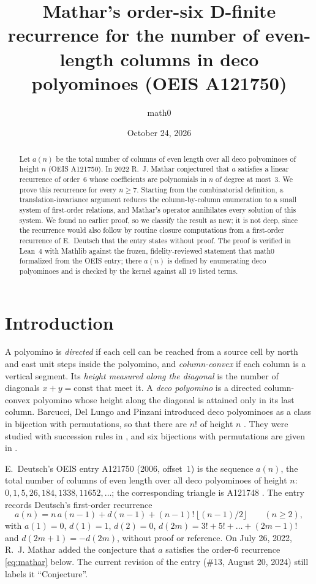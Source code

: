 \documentclass[11pt]{amsart}
\title[Mathar's recurrence for even columns in deco polyominoes]{Mathar's order-six D-finite recurrence for the number of even-length columns in deco polyominoes (OEIS A121750)}
\author{math0}
\date{October 24, 2026}
\theoremstyle{plain}
\theoremstyle{definition}
\begin{document}
\begin{abstract}
Let $a(n)$ be the total number of columns of even length over all deco polyominoes of height $n$ (OEIS A121750). In 2022 R.~J. Mathar conjectured that $a$ satisfies a linear recurrence of order~$6$ whose coefficients are polynomials in $n$ of degree at most~$3$. We prove this recurrence for every $n\ge7$. Starting from the combinatorial definition, a translation-invariance argument reduces the column-by-column enumeration to a small system of first-order relations, and Mathar's operator annihilates every solution of this system. We found no earlier proof, so we classify the result as new; it is not deep, since the recurrence would also follow by routine closure computations from a first-order recurrence of E.~Deutsch that the entry states without proof. The proof is verified in Lean~4 with Mathlib against the frozen, fidelity-reviewed statement that math0 formalized from the OEIS entry; there $a(n)$ is defined by enumerating deco polyominoes and is checked by the kernel against all $19$ listed terms.
\end{abstract}
\maketitle

\section{Introduction}

A polyomino is \emph{directed} if each cell can be reached from a source cell by north and east unit steps inside the polyomino, and \emph{column-convex} if each column is a vertical segment. Its \emph{height measured along the diagonal} is the number of diagonals $x+y=\mathrm{const}$ that meet it. A \emph{deco polyomino} is a directed column-convex polyomino whose height along the diagonal is attained only in its last column. Barcucci, Del Lungo and Pinzani introduced deco polyominoes as a class in bijection with permutations, so that there are $n!$ of height $n$ \cite{BDP}. They were studied with succession rules in \cite{BBD}, and six bijections with permutations are given in \cite{DPP}.

E.~Deutsch's OEIS entry A121750 \cite{A121750} (2006, offset~$1$) is the sequence $a(n)$, the total number of columns of even length over all deco polyominoes of height $n$: $0,1,5,26,184,1338,11652,\dots$; the corresponding triangle is A121748 \cite{A121748}. The entry records Deutsch's first-order recurrence
\begin{equation}\label{eq:deutsch}
  a(n)=n\,a(n-1)+d(n-1)+(n-1)!\,\lfloor (n-1)/2\rfloor\qquad(n\ge2),
\end{equation}
with $a(1)=0$, $d(1)=1$, $d(2)=0$, $d(2m)=3!+5!+\dots+(2m-1)!$ and $d(2m+1)=-d(2m)$, without proof or reference. On July 26, 2022, R.~J. Mathar added the conjecture that $a$ satisfies the order-$6$ recurrence \eqref{eq:mathar} below. The current revision of the entry (\#13, August 20, 2024) still labels it ``Conjecture''.
\end{document}
